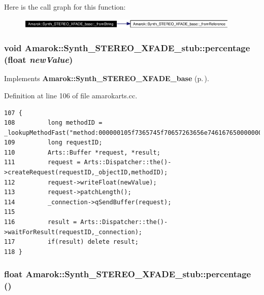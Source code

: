 Here is the call graph for this function:\begin{figure}[H]
\begin{center}
\leavevmode
\includegraphics[width=300pt]{classAmarok_1_1Synth__STEREO__XFADE__base_Amarok_1_1Synth__STEREO__XFADE__stube1_cgraph}
\end{center}
\end{figure}
\subsubsection{\setlength{\rightskip}{0pt plus 5cm}void Amarok::Synth\_\-STEREO\_\-XFADE\_\-stub::percentage (float {\em new\-Value})\hspace{0.3cm}{\tt  [virtual]}}\label{classAmarok_1_1Synth__STEREO__XFADE__stub_Amarok_1_1Synth__STEREO__XFADE__stuba2}




Implements {\bf Amarok::Synth\_\-STEREO\_\-XFADE\_\-base} {\rm (p.\,\pageref{classAmarok_1_1Synth__STEREO__XFADE__base_Amarok_1_1Synth__STEREO__XFADE__skela10})}.

Definition at line 106 of file amarokarts.cc.



\footnotesize\begin{verbatim}107 {
108         long methodID = _lookupMethodFast("method:000000105f7365745f70657263656e746167650000000005766f696400000000020000000100000006666c6f617400000000096e657756616c7565000000000000000000");
109         long requestID;
110         Arts::Buffer *request, *result;
111         request = Arts::Dispatcher::the()->createRequest(requestID,_objectID,methodID);
112         request->writeFloat(newValue);
113         request->patchLength();
114         _connection->qSendBuffer(request);
115 
116         result = Arts::Dispatcher::the()->waitForResult(requestID,_connection);
117         if(result) delete result;
118 }
\end{verbatim}\normalsize 
{}
\subsubsection{\setlength{\rightskip}{0pt plus 5cm}float Amarok::Synth\_\-STEREO\_\-XFADE\_\-stub::percentage ()\hspace{0.3cm}{\tt  [virtual]}}\label{classAmarok_1_1Synth__STEREO__XFADE__stub_Amarok_1_1Synth__STEREO__XFADE__stuba1}




